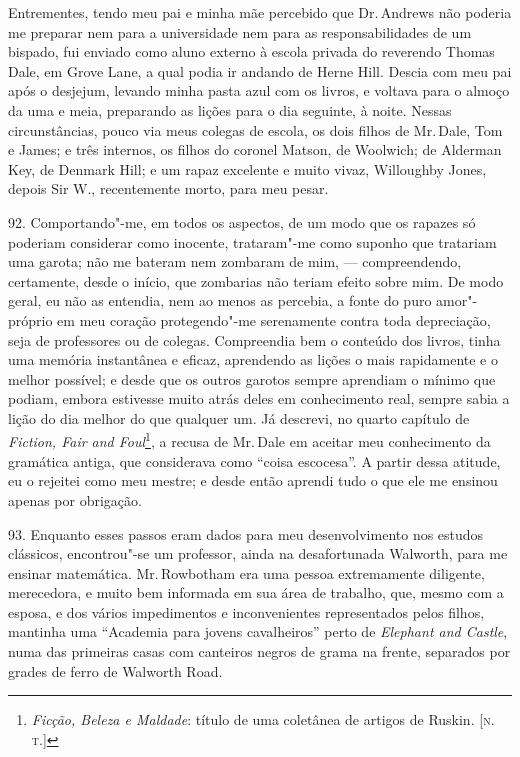 Entrementes, tendo meu pai e minha mãe percebido que Dr.\,Andrews não
poderia me preparar nem para a universidade nem para as
responsabilidades de um bispado, fui enviado como aluno externo à escola
privada do reverendo Thomas Dale, em Grove Lane, a qual podia ir andando
de Herne Hill. Descia com meu pai após o desjejum, levando minha pasta
azul com os livros, e voltava para o almoço da uma e meia, preparando as
lições para o dia seguinte, à noite. Nessas circunstâncias, pouco via
meus colegas de escola, os dois filhos de Mr.\,Dale, Tom e James; e três
internos, os filhos do coronel Matson, de Woolwich; de Alderman Key, de
Denmark Hill; e um rapaz excelente e muito vivaz, Willoughby Jones,
depois Sir W., recentemente morto, para meu pesar.

92. Comportando"-me, em todos os aspectos, de um modo que os rapazes só
poderiam considerar como inocente, trataram"-me como suponho que
tratariam uma garota; não me bateram nem zombaram de mim, ---
compreendendo, certamente, desde o início, que zombarias não teriam
efeito sobre mim. De modo geral, eu não as entendia, nem ao menos as
percebia, a fonte do puro amor"-próprio em meu coração protegendo"-me
serenamente contra toda depreciação, seja de professores ou de colegas.
Compreendia bem o conteúdo dos livros, tinha uma memória instantânea e
eficaz, aprendendo as lições o mais rapidamente e o melhor possível; e
desde que os outros garotos sempre aprendiam o mínimo que podiam, embora
estivesse muito atrás deles em conhecimento real, sempre sabia a lição
do dia melhor do que qualquer um. Já descrevi, no quarto capítulo de
\emph{Fiction, Fair and Foul}\footnote{\emph{Ficção, Beleza e Maldade}:
  título de uma coletânea de artigos de Ruskin. {[}\textsc{n.\,t.}{]}}, a
recusa de Mr.\,Dale em aceitar meu conhecimento da gramática antiga, que
considerava como ``coisa escocesa''. A partir dessa atitude, eu o
rejeitei como meu mestre; e desde então aprendi tudo o que ele me
ensinou apenas por obrigação.

93. Enquanto esses passos eram dados para meu desenvolvimento nos
estudos clássicos, encontrou"-se um professor, ainda na desafortunada
Walworth, para me ensinar matemática. Mr.\,Rowbotham era uma pessoa
extremamente diligente, merecedora, e muito bem informada em sua área de
trabalho, que, mesmo com a esposa, e dos vários impedimentos e
inconvenientes representados pelos filhos, mantinha uma ``Academia para
jovens cavalheiros'' perto de \emph{Elephant and Castle}, numa das
primeiras casas com canteiros negros de grama na frente, separados por
grades de ferro de Walworth Road.

